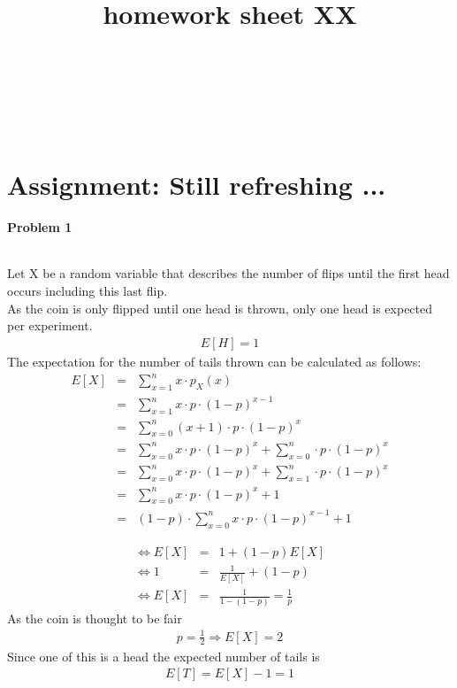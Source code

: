 \documentclass{article}
\title{homework sheet XX}
\author{
\name{Andre Seitz}\\
\imat{03622870}\\
\email{andre.seitz@mytum.de}
\And
\name{Linda Leidig} \\
\imat{03608416}\\
\email{linda.leidig@tum.de}
}
\begin{document}
\maketitle

\section{Assignment: Still refreshing ...}
\paragraph*{Problem 1}
$\;$ 

Let X be a random variable that describes the number of flips until the first head occurs including this last flip.\\
As the coin is only flipped until one head is thrown, only one head is expected per experiment.
\begin{eqnarray}
E[H] = 1
\end{eqnarray}
The expectation for the number of tails thrown can be calculated as follows:
\begin{eqnarray}
E[X] &=& \sum_{x=1}^{n}x\cdot p_X(x)\\
 &=& \sum_{x=1}^{n}x \cdot p \cdot (1-p)^{x-1}\\
&=& \sum_{x=0}^{n}(x+1) \cdot p \cdot (1-p)^{x}\\
&=& \sum_{x=0}^{n} x \cdot p \cdot (1-p)^{x} + \sum_{x=0}^{n} \cdot p \cdot (1-p)^{x}\\
&=& \sum_{x=0}^{n} x \cdot p \cdot (1-p)^{x} + \sum_{x=1}^{n} \cdot p \cdot (1-p)^{x}\\
&=& \sum_{x=0}^{n} x \cdot p \cdot (1-p)^{x} + 1\\
&=& (1-p) \cdot \sum_{x=0}^{n} x \cdot p \cdot (1-p)^{x-1} + 1
\end{eqnarray}

\begin{eqnarray}
\Leftrightarrow E[X] &=& 1+(1-p)E[X]\\
\Leftrightarrow 1 &=& \frac{1}{E[X]}+(1-p)\\
\Leftrightarrow E[X] &=& \frac{1}{1-(1-p)} = \frac{1}{p}
\end{eqnarray}
As the coin is thought to be fair
\begin{eqnarray}
p = \frac{1}{2} \Rightarrow E[X] = 2
\end{eqnarray}
Since one of this is a head the expected number of tails is
\begin{eqnarray}
E[T] = E[X] - 1 = 1
\end{eqnarray}
\end{document}
